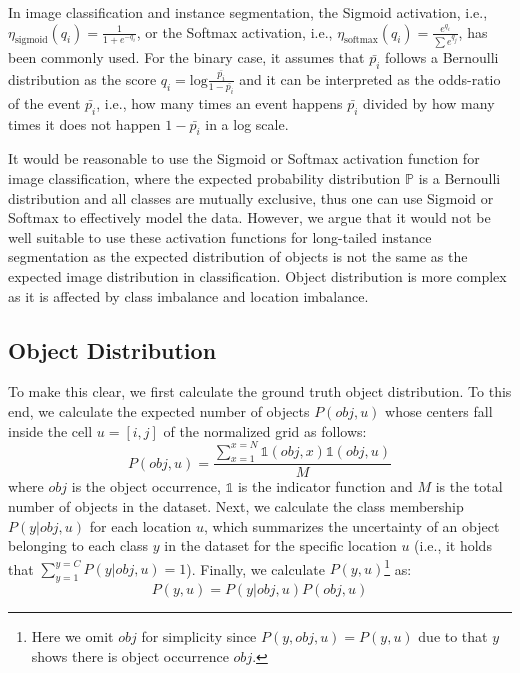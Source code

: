 \documentclass[runningheads]{llncs}
\begin{document}
In image classification and instance segmentation, the Sigmoid activation, i.e.,  $\eta_{\text{sigmoid}}(q_i)=\frac{1}{1+e^{-q_i}}$, or the Softmax activation, i.e.,  $\eta_{\text{softmax}}(q_i)=\frac{e^{q_i}}{\sum{e^{q_j}}}$, has been commonly used. For the binary case, it assumes that $\bar{p_i}$ follows a Bernoulli distribution as the score  $q_i=\text{log}\frac{\bar{p_i}}{1-\bar{p_i}}$ and it can be interpreted as the odds-ratio of the event $\bar{p_i}$, i.e., how many times an event happens $\bar{p_i}$ divided by how many times it does not happen $1-\bar{p_i}$ in a log scale.
 


It would be reasonable to use the Sigmoid or Softmax activation function for image classification, where the expected probability distribution $\mathbb{P}$ is a Bernoulli distribution and all classes are mutually exclusive, thus one can use Sigmoid or Softmax to effectively model the data.
However, we argue that it would not be well suitable to use these activation functions for long-tailed instance segmentation as the expected distribution of objects is not the same as the expected image distribution in classification. Object distribution is more complex as it is affected by class imbalance and location imbalance.  

\subsection{Object Distribution}
\label{obj_distr_calculation}
To make this clear, we first calculate the ground truth object distribution. To this end, we calculate the expected number of objects $P(obj,u)$ whose centers fall inside the cell $u=[i,j]$ of the normalized grid as follows:
\begin{equation}
    P(obj,u)=\frac{\sum_{x=1}^{x=N}\mathbb{1}(obj,x) \mathbb{1}(obj,u)}{M}
    \label{pobj}
\end{equation}
where $obj$ is the object occurrence, $\mathbb{1}$ is the indicator function and $M$ is the total number of objects in the dataset.
Next, we calculate the class membership $P(y|obj,u)$ for each location $u$, which summarizes the uncertainty of an object belonging to each class $y$ in the dataset for the specific location $u$ (i.e., it holds that $ \sum_{y=1} ^{y=C}{P(y|obj,u)=1}$). Finally, we calculate $P(y,u)$\footnote{Here we omit $obj$ for simplicity since $P(y,obj,u) = P(y,u)$ due to that $y$ shows there is object occurrence $obj$.} as:
\begin{equation}
    P(y,u) = P(y|obj,u)P(obj,u)
    \label{eq:obj_distr}
\end{equation}
\end{document}
